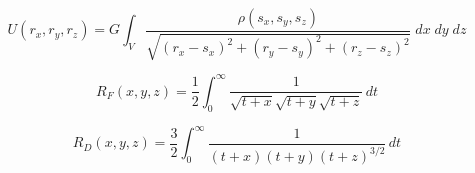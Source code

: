 \begin{equation}
    U(r_x, r_y, r_z) = G\int_V\frac{\rho{(s_x,s_y,s_z)}}{\sqrt{(r_x-s_x)^2+(r_y-s_y)^2+(r_z-s_z)^2}}\;dx\;dy\;dz
    \label{eq:ur-gen-rect}
\end{equation}

\begin{equation}
    R_F\!\left(x, y, z\right) = \frac{1}{2} \int_{0}^{\infty} \frac{1}{\sqrt{t + x} \sqrt{t + y} \sqrt{t + z}} \, dt
    \label{eq:elliptic_RF}
\end{equation}

\begin{equation}
    R_D\!\left(x, y, z\right) = \frac{3}{2} \int_{0}^{\infty} \frac{1}{\left(t + x\right) \left(t + y\right) {\left(t + z\right)}^{3 / 2}} \, dt
    \label{eq:elliptic_RD}
\end{equation}